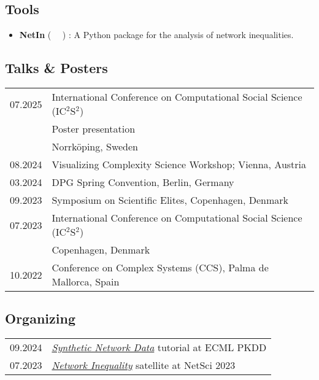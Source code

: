 \documentclass[11pt]{article} %
\begin{document}
\subsection*{Tools}
%
\begin{itemize}
    \item \textbf{NetIn} (~\href{https://pypi.org/project/netin/}{\faPython}
        \hspace{0.5em}\href{https://github.com/CSHVienna/NetworkInequalities}{\faGithub}
        \hspace{0.5em}\href{https://cshvienna.github.io/NetworkInequalities/}{\faFile*[regular]}~)
        : A Python package for the analysis of network inequalities.

\end{itemize}

\subsection*{Talks \& Posters}
\begin{longtable}[l]{@{}p{} p{}}
  07.2025     & International Conference on Computational Social Science (IC$^2$S$^2$)\\
              & Poster presentation\\
              & Norrk\"oping, Sweden\\
  08.2024     & Visualizing Complexity Science Workshop; Vienna, Austria\\
  03.2024     & DPG Spring Convention, Berlin, Germany\\
  09.2023     & Symposium on Scientific Elites, Copenhagen, Denmark\\
  07.2023     & International Conference on Computational Social Science (IC$^2$S$^2$)\\
              & Copenhagen, Denmark\\
  10.2022     & Conference on Complex Systems (CCS), Palma de Mallorca, Spain
\end{longtable}

\subsection*{Organizing}
\label{organizing}
\begin{longtable}[l]{@{}p{} p{}}
  09.2024     & \href{https://sites.google.com/view/snma-tutorial/2024}{\emph{Synthetic Network Data}} tutorial at ECML PKDD\\
  07.2023     & \href{https://sites.google.com/view/netin-satellite-2023/home}{\emph{Network Inequality}} satellite at NetSci 2023\\
\end{longtable}
\end{document}
